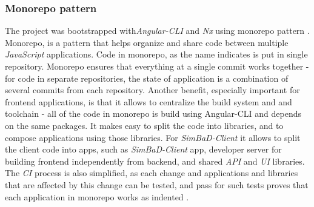 \subsubsection{Monorepo pattern}
The project was bootstrapped with\textit{Angular-CLI} and \textit{Nx} using monorepo pattern \cite{NxCLI}. Monorepo, is a pattern that helps organize and share code between multiple \textit{JavaScript} applications. Code in monorepo, as the name indicates is put in single repository. Monorepo ensures that everything at a single commit works together - for code in separate repositories, the state of application is a combination of several commits from each repository. Another benefit, especially important for frontend applications, is that it allows to centralize the build system and and toolchain - all of the code in monorepo is build using Angular-CLI and depends on the same packages. It makes easy to split the code into libraries, and to compose applications using those libraries. For \textit{SimBaD-Client} it allows to split the client code into apps, such as \textit{SimBaD-Client} app, developer server for building frontend independently from backend, and shared \textit{API} and \textit{UI} libraries. The \textit{CI} process is also simplified, as each change and applications and libraries that are affected by this change can be tested, and pass for such tests proves that each application in monorepo works as indented \cite{MonorepoSavkin}.
